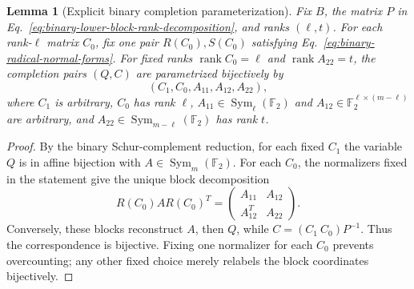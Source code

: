 \documentclass[11pt]{article}
\newcommand{\F}{\mathbb F}
\newcommand{\Sym}{\operatorname{Sym}}
\newcommand{\rank}{\operatorname{rank}}
\newcommand{\1}{\mathbf 1}
\theoremstyle{plain}
\newtheorem{lemma}[theorem]{Lemma}
\theoremstyle{definition}
\theoremstyle{remark}
\begin{document}
\begin{lemma}[Explicit binary completion parameterization]
\label{lem:binary-completion-parameterization}
Fix $B$, the matrix $P$ in Eq.~\eqref{eq:binary-lower-block-rank-decomposition}, and
ranks $(\ell,t)$.  For each rank-$\ell$ matrix $C_0$, fix one pair
$R(C_0),S(C_0)$ satisfying Eq.~\eqref{eq:binary-radical-normal-forms}.
For fixed ranks $\rank C_0=\ell$ and $\rank A_{22}=t$, the completion pairs
$(Q,C)$ are parametrized bijectively by
\begin{equation}
 (C_1,C_0,A_{11},A_{12},A_{22}),
 \label{eq:binary-completion-parameter-tuple}
\end{equation}
where $C_1$ is arbitrary, $C_0$ has rank $\ell$,
$A_{11}\in\Sym_\ell(\F_2)$ and
$A_{12}\in\F_2^{\ell\times(m-\ell)}$ are arbitrary, and
$A_{22}\in\Sym_{m-\ell}(\F_2)$ has rank $t$.
\end{lemma}
\begin{proof}
By the binary Schur-complement reduction, for each fixed $C_1$ the variable
$Q$ is in affine bijection with $A\in\Sym_m(\F_2)$.  For each $C_0$, the
normalizers fixed in the statement give the unique block decomposition
\[
 R(C_0)AR(C_0)^T
 =\begin{pmatrix}A_{11}&A_{12}\\A_{12}^T&A_{22}\end{pmatrix}.
\]
Conversely, these blocks reconstruct $A$, then $Q$, while
$C=(C_1\ C_0)P^{-1}$.  Thus the correspondence is bijective.  Fixing one
normalizer for each $C_0$ prevents overcounting; any other fixed choice merely
relabels the block coordinates bijectively.
\end{proof}
\end{document}
